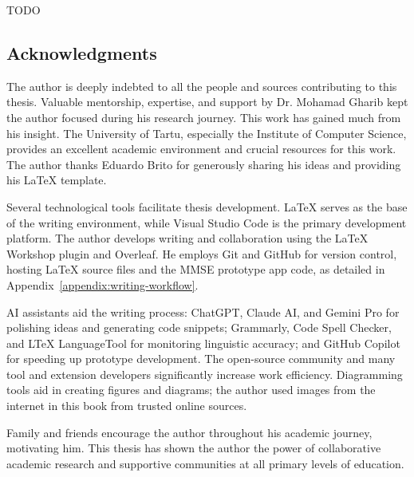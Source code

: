 TODO

\subsection*{Acknowledgments}

The author is deeply indebted to all the people and sources contributing to this thesis. Valuable mentorship, expertise, and support by Dr. Mohamad Gharib kept the author focused during his research journey. This work has gained much from his insight. The University of Tartu, especially the Institute of Computer Science, provides an excellent academic environment and crucial resources for this work. The author thanks Eduardo Brito for generously sharing his ideas and providing his LaTeX template.

Several technological tools facilitate thesis development. LaTeX serves as the base of the writing environment, while Visual Studio Code is the primary development platform. The author develops writing and collaboration using the LaTeX Workshop plugin and Overleaf. He employs Git and GitHub for version control, hosting LaTeX source files and the MMSE prototype app code, as detailed in Appendix~\ref{appendix:writing-workflow}.

AI assistants aid the writing process: ChatGPT, Claude AI, and Gemini Pro for polishing ideas and generating code snippets; Grammarly, Code Spell Checker, and LTeX LanguageTool for monitoring linguistic accuracy; and GitHub Copilot for speeding up prototype development. The open-source community and many tool and extension developers significantly increase work efficiency. Diagramming tools aid in creating figures and diagrams; the author used images from the internet in this book from trusted online sources.

Family and friends encourage the author throughout his academic journey, motivating him. This thesis has shown the author the power of collaborative academic research and supportive communities at all primary levels of education.